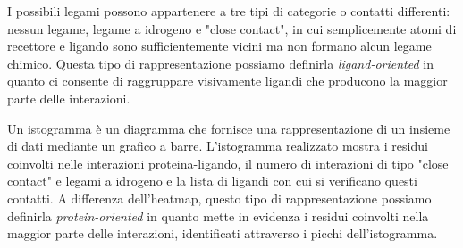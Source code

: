 I possibili legami possono appartenere a tre tipi di categorie o contatti differenti: nessun legame, legame a idrogeno e "close contact", in cui semplicemente atomi di recettore e ligando sono sufficientemente vicini ma non formano alcun legame chimico. 
Questa tipo di rappresentazione possiamo definirla \textit{ligand-oriented} in quanto ci consente di raggruppare visivamente ligandi che producono la maggior parte delle interazioni.


Un istogramma è un diagramma che fornisce una rappresentazione di un insieme di dati mediante un grafico a barre. L'istogramma realizzato mostra i residui coinvolti nelle interazioni proteina-ligando, il numero di interazioni di tipo "close contact" e legami a idrogeno e la lista di ligandi con cui si verificano questi contatti.
A differenza dell'heatmap, questo tipo di rappresentazione possiamo definirla \textit{protein-oriented} in quanto mette in evidenza i residui coinvolti nella maggior parte delle interazioni, identificati attraverso i picchi dell'istogramma.



